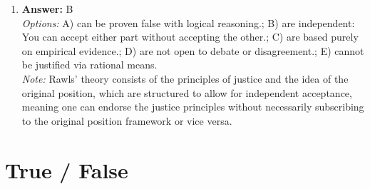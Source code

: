 \documentclass[12pt]{article}
\begin{document}
\begin{enumerate}[label=\arabic*.]
\item \textbf{Answer:} B
\\ \textit{Options:} A) can be proven false with logical reasoning.; B) are independent: You can accept either part without accepting the other.; C) are based purely on empirical evidence.; D) are not open to debate or disagreement.; E) cannot be justified via rational means.
\\ \textit{Note:} Rawls' theory consists of the principles of justice and the idea of the original position, which are structured to allow for independent acceptance, meaning one can endorse the justice principles without necessarily subscribing to the original position framework or vice versa.
\end{enumerate}

\section*{True / False}
\end{document}
